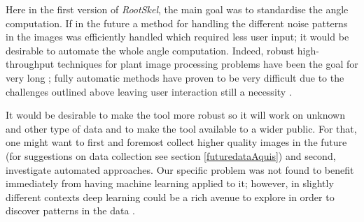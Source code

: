Here in the first version of \textit{RootSkel}, the main goal was to standardise the angle computation. If in the future  a method for handling the different noise patterns in the images was efficiently handled which required less user input; it would be desirable to automate the whole angle computation. Indeed, robust high-throughput techniques for plant image processing problems have been the goal for very long \cite{hartmann2011htpheno,diener2013automated,lee2018automated,plantCV}; fully automatic methods have proven to be very difficult due to the challenges outlined above leaving user interaction still a necessity \cite{pound2013rootnav}.







It would be desirable to make the tool more robust so it will work on unknown and other type of data %
and to make the tool available to a wider public. For that, one might want to first and foremost collect higher quality images in the future (for suggestions on data collection see section \ref{futuredataAquis}) and second, investigate automated approaches. %
Our specific problem was not found to benefit immediately from having machine learning applied to it; however, in slightly different contexts deep learning could be a rich avenue to explore in order to discover patterns in the data \cite{pound2017deep,lee2018automated}.

